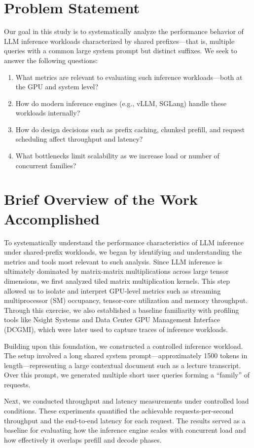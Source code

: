 \section{Problem Statement}
Our goal in this study is to systematically analyze the performance behavior of LLM inference workloads characterized by shared prefixes—that is, multiple queries with a common large system prompt but distinct suffixes.
We seek to answer the following questions:
\begin{enumerate}
    \item What metrics are relevant to evaluating such inference workloads—both at the GPU and system level?
    \item How do modern inference engines (e.g., vLLM, SGLang) handle these workloads internally?
    \item How do design decisions such as prefix caching, chunked prefill, and request scheduling affect throughput and latency?
    \item What bottlenecks limit scalability as we increase load or number of concurrent families?
\end{enumerate}

\section{Brief Overview of the Work Accomplished}
To systematically understand the performance characteristics of LLM inference under shared-prefix workloads, we began by identifying and understanding the metrics and tools most relevant to such analysis. Since LLM inference is ultimately dominated by matrix-matrix multiplications across large tensor dimensions, we first analyzed tiled matrix multiplication kernels. This step allowed us to isolate and interpret GPU-level metrics such as streaming multiprocessor (SM) occupancy, tensor-core utilization and memory throughput. Through this exercise, we also established a baseline familiarity with profiling tools like Nsight Systems and Data Center GPU Management Interface (DCGMI), which were later used to capture traces of inference workloads.

Building upon this foundation, we constructed a controlled inference workload. The setup involved a long shared system prompt—approximately 1500 tokens in length—representing a large contextual document such as a lecture transcript. Over this prompt, we generated multiple short user queries forming a ``family'' of requests. 

Next, we conducted throughput and latency measurements under controlled load conditions. These experiments quantified the achievable requests-per-second throughput and the end-to-end latency for each request. The results served as a baseline for evaluating how the inference engine scales with concurrent load and how effectively it overlaps prefill and decode phases.

